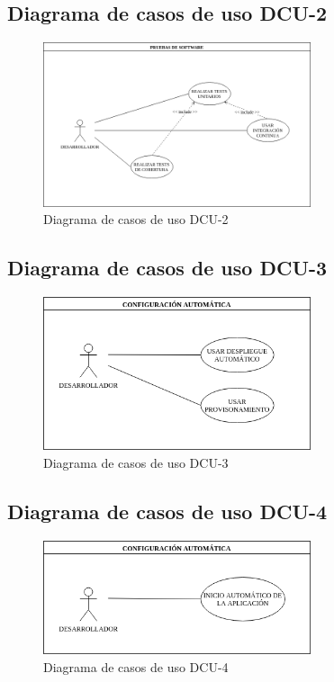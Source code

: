 \subsection{Diagrama de casos de uso DCU-2 }
\begin{figure}[H]
  \begin{center}
    \includegraphics[width=0.7\textwidth]{imagenes/DCU-2.png}
    \caption{Diagrama de casos de uso DCU-2}
    \label{fig:DCU-2}
  \end{center}
\end{figure}
\subsection{Diagrama de casos de uso DCU-3 }
\begin{figure}[H]
  \begin{center}
    \includegraphics[width=0.7\textwidth]{imagenes/DCU-3.png}
    \caption{Diagrama de casos de uso DCU-3}
    \label{fig:DCU-3}
  \end{center}
\end{figure}
\subsection{Diagrama de casos de uso DCU-4 }
\begin{figure}[H]
  \begin{center}
    \includegraphics[width=0.7\textwidth]{imagenes/DCU-4.png}
    \caption{Diagrama de casos de uso DCU-4}
    \label{fig:DCU-4}
  \end{center}
\end{figure}


